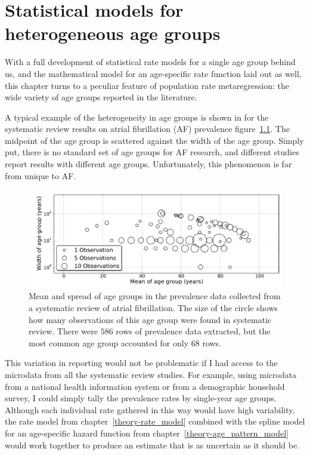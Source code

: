 \chapter{Statistical models for heterogeneous age groups}
\label{chap:age_group_model}
With a full development of statistical rate models for a single age group
behind us, and the mathematical model for an age-specific rate
function laid out as well, this chapter turns to a peculiar feature of
population rate metaregression: the wide variety of age groups reported
in the literature.

A typical example of the heterogeneity in age groups is shown in for
the systematic review results on atrial fibrillation (AF)
prevalence\cite{TK_AF_report_reference}
figure~\ref{age-group-model-af-age-groups}.  The midpoint of the
age group is scattered against the width of the age group.  Simply put,
there is no standard set of age groups for AF research, and different
studies report results with different age groups. Unfortunately, this
phenomenon is far from unique to AF.

\begin{figure}[h]
\begin{center}
\includegraphics[width=\textwidth]{af_age_groups_scatter.pdf}
\end{center}
\caption{Mean and spread of age groups in the prevalence data
  collected from a systematic review of atrial fibrillation. The
  size of the circle shows how many observations of this age group
  were found in systematic review. There were
  $586$ rows of prevalence data
  extracted, but the most common age group accounted for only
  $68$ rows.}
\label{age-group-model-af-age-groups}
\end{figure}

This variation in reporting would not be problematic if I had access
to the microdata from all the systematic review studies.  For
example, using microdata from a national health information system or
from a demographic household survey, I could simply tally the
prevalence rates by single-year age groups.  Although each individual
rate gathered in this way would have high variability, the rate model
from chapter~\ref{theory-rate_model} combined with the spline model
for an age-specific hazard function from chapter~\ref{theory-age_pattern_model} would
work together to produce an estimate that is as uncertain as it should be.

